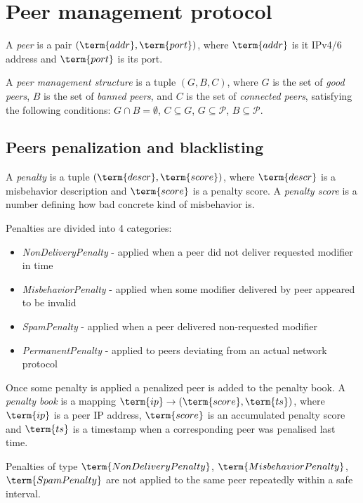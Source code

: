\section{Peer management protocol}\label{sec:peer-management-protocol}

\newcommand{\peers}{\mathcal{P}}

A \emph{peer} is a pair $(\term{addr}, \term{port})$,
where $\term{addr}$ is it IPv4/6 address and $\term{port}$ is its port.

A \emph{peer management structure} is a tuple $(G, B, C)$,
where $G$ is the set of \emph{good peers}, $B$ is the set of \emph{banned peers}, and
$C$ is the set of \emph{connected peers}, satisfying the following conditions:
$G \cap B = \emptyset$,
$C \subseteq G$,
$G \subseteq \peers$,
$B \subseteq \peers$.

\subsection{Peers penalization and blacklisting}\label{subsec:peers-penalization-and-blacklisting}

A \emph{penalty} is a tuple $(\term{descr}, \term{score})$, where $\term{descr}$ is a misbehavior
description and $\term{score}$ is a penalty score.
A \emph{penalty score} is a number defining how bad concrete kind of misbehavior is.

Penalties are divided into 4 categories:

\begin{itemize}
    \item{\em NonDeliveryPenalty} - applied when a peer did not deliver requested modifier in time
    \item{\em MisbehaviorPenalty} - applied when some modifier delivered by peer appeared to be invalid
    \item{\em SpamPenalty} - applied when a peer delivered non-requested modifier
    \item{\em PermanentPenalty} - applied to peers deviating from an actual network protocol
\end{itemize}

Once some penalty is applied a penalized peer is added to the penalty book.
A \emph{penalty book} is a mapping $\term{ip} \rightarrow (\term{score}, \term{ts})$, where $\term{ip}$
is a peer IP address, $\term{score}$ is an accumulated penalty score and $\term{ts}$ is a timestamp when a corresponding
peer was penalised last time.

Penalties of type $\term{NonDeliveryPenalty}$, $\term{MisbehaviorPenalty}$, $\term{SpamPenalty}$ are not applied
to the same peer repeatedly within a safe interval.


